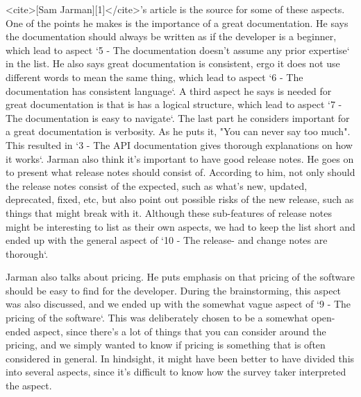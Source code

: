 \documentclass[11pt]{article}
\begin{document}
\begin{multicols}{2}
    <cite>[Sam Jarman][1]</cite>'s article is the source for some of these
    aspects. One of the points he makes is the importance of a great documentation.
    He says the documentation should always be written as if the developer is
    a beginner, which lead to aspect `5 - The documentation doesn't assume any prior expertise` in the list.
    He also says great documentation is consistent, ergo it does not use different
    words to mean the same thing, which lead to aspect `6 - The documentation has consistent language`.
    A third aspect he says is needed for great documentation is that is has a
    logical structure, which lead to aspect `7 - The documentation is easy to navigate`.
    The last part he considers important for a great documentation is verbosity.
    As he puts it, "You can never say too much". This resulted in `3 - The API documentation gives thorough explanations on how it works`.
    Jarman also think it's important to have good release notes. He goes on
    to present what release notes should consist of. According to him, not
    only should the release notes consist of the expected, such as what's new,
    updated, deprecated, fixed, etc, but also point out possible risks of the new release,
    such as things that might break with it. Although these sub-features of release notes
    might be interesting to list as their own aspects, we had to keep the list short
    and ended up with the general aspect of `10 - The release- and change notes are thorough`.

    Jarman also talks about pricing. He puts emphasis on that pricing of the software
    should be easy to find for the developer. During the brainstorming, this
    aspect was also discussed, and we ended up with the somewhat vague
    aspect of `9 - The pricing of the software`. This was deliberately chosen
    to be a somewhat open-ended aspect, since there's a lot of things that you can
    consider around the pricing, and we simply wanted to know if pricing is something
    that is often considered in general. In hindsight, it might have been better to have
    divided this into several aspects, since it's difficult to know how the
    survey taker interpreted the aspect.


\end{multicols}
\end{document}
